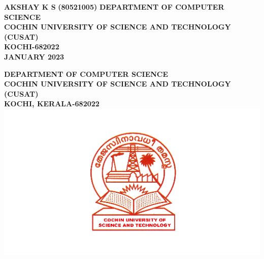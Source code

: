 \documentclass[a4paper,12pt]{report}
\begin{document}
\begin{center}
		\textbf{AKSHAY K S\hspace{600pt}}
		\vspace*{20pt}
		\textbf{(80521005) \hspace{300pt}}
		\vspace*{0pt}
		\small\textbf{DEPARTMENT OF COMPUTER SCIENCE\\}
		\small\textbf{COCHIN UNIVERSITY OF SCIENCE AND TECHNOLOGY (CUSAT)\\}
		\small\textbf{KOCHI-682022\\}
		\vspace{10pt}
		\small\textbf{JANUARY 2023}
		
		
		
	\end{center}
	\newpage
	\thispagestyle{empty}
	
	
	\begin{center}
		\large\textbf{DEPARTMENT OF COMPUTER SCIENCE\\}
		\small\textbf{COCHIN UNIVERSITY OF SCIENCE AND TECHNOLOGY (CUSAT)\\}
		\small\textbf{KOCHI, KERALA-682022\\}
		\vspace*{20pt}
		\includegraphics[scale=0.5]{cusat.png}
		\vspace*{20pt}
	\end{center}
	\vspace{15pt}
	
\end{document}
